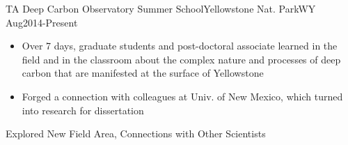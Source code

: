 \begin{experiences}
 \experience
    {TA}       {Deep Carbon Observatory Summer School}{Yellowstone Nat. Park}{WY}
    {Aug2014-Present}      {
                      \begin{itemize}
                        \item Over 7 days, graduate students and post-doctoral associate learned in the field and in the classroom about the complex nature and processes of deep carbon that are manifested at the surface of Yellowstone
                        \item Forged a connection with colleagues at Univ. of New Mexico, which turned into research for dissertation
                      \end{itemize}
                    }
                    {Explored New Field Area, Connections with Other Scientists}
  \emptySeparator  
\end{experiences}

